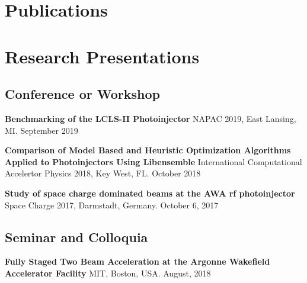 \documentclass[11pt,a4paper,sans]{moderncv}        %
\begin{document}
\section{Publications}
%





\section{Research Presentations}
\subsection{Conference or Workshop} %
\textbf{Benchmarking of the LCLS-II Photoinjector}\newline
NAPAC 2019, East Lansing, MI. September 2019
\vspace{0.3em}

\textbf{Comparison of Model Based and Heuristic Optimization Algorithms \newline
	Applied to Photoinjectors Using Libensemble}\newline
International Computational Accelertor Physics 2018, Key West, FL. October 2018
\vspace{0.3em}

\textbf{Study of space charge dominated beams at the AWA rf photoinjector}\newline
Space Charge 2017, Darmstadt, Germany. October 6, 2017

\subsection{Seminar and Colloquia}
\textbf{Fully  Staged Two Beam Acceleration at the Argonne Wakefield Accelerator
	Facility}\newline
MIT, Boston, USA. August, 2018
\vspace{0.3em}
\end{document}
